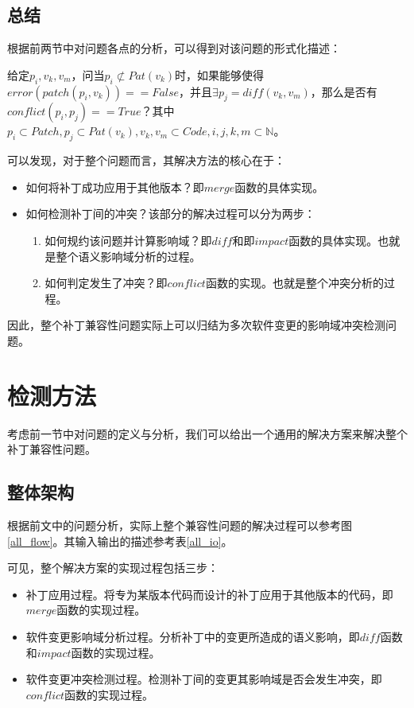 \subsection{总结}

根据前两节中对问题各点的分析，可以得到对该问题的形式化描述：

给定$p_i,v_k,v_m$，问当$p_i \not \subset Pat(v_k)$时，如果能够使得$error(patch(p_i,v_k)) == False$，并且$\exists p_j = diff(v_k,v_m)$，那么是否有$conflict(p_i,p_j) == True$？其中$p_i \subset Patch,p_j \subset Pat(v_k),v_k,v_m \subset Code,i,j,k,m \subset \mathbb{N}$。


可以发现，对于整个问题而言，其解决方法的核心在于：
\begin{itemize}
	\item 如何将补丁成功应用于其他版本？即$merge$函数的具体实现。
	\item 如何检测补丁间的冲突？该部分的解决过程可以分为两步：
	\begin{enumerate}
		\item 如何规约该问题并计算影响域？即$diff$和即$impact$函数的具体实现。也就是整个语义影响域分析的过程。
		\item 如何判定发生了冲突？即$conflict$函数的实现。也就是整个冲突分析的过程。		
	\end{enumerate}
\end{itemize}

因此，整个补丁兼容性问题实际上可以归结为多次软件变更的影响域冲突检测问题。


\section{检测方法}
\label {problem_solve}

考虑前一节中对问题的定义与分析，我们可以给出一个通用的解决方案来解决整个补丁兼容性问题。

\subsection{整体架构}
\label {problem_all}

根据前文中的问题分析，实际上整个兼容性问题的解决过程可以参考图\ref {all_flow}。其输入输出的描述参考表\ref {all_io}。

可见，整个解决方案的实现过程包括三步：
\begin{itemize}
	\item 补丁应用过程。将专为某版本代码而设计的补丁应用于其他版本的代码，即$merge$函数的实现过程。
	\item 软件变更影响域分析过程。分析补丁中的变更所造成的语义影响，即$diff$函数和$impact$函数的实现过程。
	\item 软件变更冲突检测过程。检测补丁间的变更其影响域是否会发生冲突，即$conflict$函数的实现过程。
\end{itemize}

